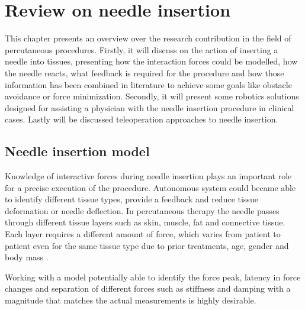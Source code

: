 \chapter{Review on needle insertion}

This chapter presents an overview over the research contribution in the field of percutaneous procedures.
Firstly, it will discuss on the action of inserting a needle into tissues, presenting how the interaction forces could be modelled, how the needle reacts, what feedback is required for the procedure and how those information has been combined in literature to achieve some goals like obstacle avoidance or force minimization. Secondly, it will present some robotics solutions designed for assisting a physician with the needle insertion procedure in clinical cases. Lastly will be discussed teleoperation approaches to needle insertion.

\section{Needle insertion model }
Knowledge of interactive forces during needle insertion plays an important role for a precise execution of the procedure. Autonomous system could became able to identify different tissue types, provide a feedback and reduce tissue deformation or needle deflection.
In percutaneous therapy the needle passes through different tissue layers such as skin, muscle, fat and connective tissue. Each layer requires a different amount of force, which varies from patient to patient even for the same tissue type due to prior treatments, age, gender and body mass \cite{Maurin2004}.

Working with a model potentially able to identify the force peak, latency in force changes and separation of different forces such as stiffness and damping with a magnitude that matches the actual measurements is highly desirable.

